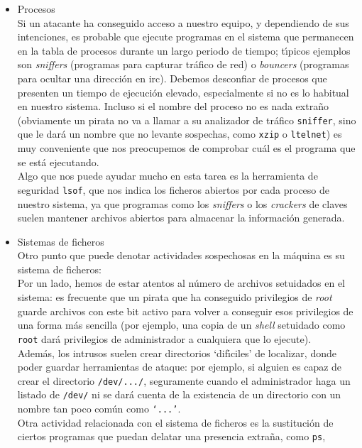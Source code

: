 \begin{itemize}
\begin{itemize}
{\tt su} ha fallado.   
\end{itemize}
\item Procesos\\
Si un atacante ha conseguido acceso a nuestro equipo, y dependiendo de sus
intenciones, es probable que ejecute programas en el sistema que permanecen
en la tabla de procesos durante un largo periodo de tiempo; t\'{\i}picos 
ejemplos son {\it sniffers} (programas para capturar tr\'afico de red) o {\it 
bouncers} (programas para ocultar una direcci\'on en {\sc irc}). Debemos 
desconfiar de procesos que presenten un tiempo de ejecuci\'on elevado, 
especialmente si no es lo habitual en nuestro sistema. Incluso si el nombre
del proceso no es nada extra\~no (obviamente un pirata no va a llamar a su
analizador de tr\'afico {\tt sniffer}, sino que le dar\'a un nombre que no 
levante sospechas, como {\tt xzip} o {\tt ltelnet}) es muy conveniente que
nos preocupemos de comprobar cu\'al es el programa que se est\'a ejecutando.\\
Algo que nos puede ayudar mucho en esta tarea es la herramienta de seguridad
{\tt lsof}, que nos indica los ficheros abiertos por cada proceso de nuestro
sistema, ya que programas como los {\it sniffers} o los {\it crackers} de claves
suelen mantener archivos abiertos para almacenar la informaci\'on generada.
\item Sistemas de ficheros\\
Otro punto que puede denotar actividades sospechosas en la m\'aquina es su
sistema de ficheros:\\ 
Por un lado, hemos de estar atentos al n\'umero de archivos
setuidados en el sistema: es frecuente que un pirata que ha conseguido 
privilegios de {\it root} guarde archivos con este bit activo para volver a
conseguir esos privilegios de una forma m\'as sencilla (por ejemplo, una copia
de un {\it shell} setuidado como {\tt root} dar\'a privilegios de administrador
a cualquiera que lo ejecute).\\
Adem\'as, los intrusos suelen crear directorios `dif\'{\i}ciles' de localizar,
donde poder guardar herramientas de ataque: por ejemplo, si alguien es capaz
de crear el directorio {\tt /dev/.../}, seguramente cuando el administrador
haga un listado de {\tt /dev/} ni se dar\'a cuenta de la existencia de un
directorio con un nombre tan poco com\'un como {\tt `...'}.\\
Otra actividad relacionada con el sistema de ficheros es la sustituci\'on de
ciertos programas que puedan delatar una presencia extra\~na, como {\tt ps},

\end{itemize}
